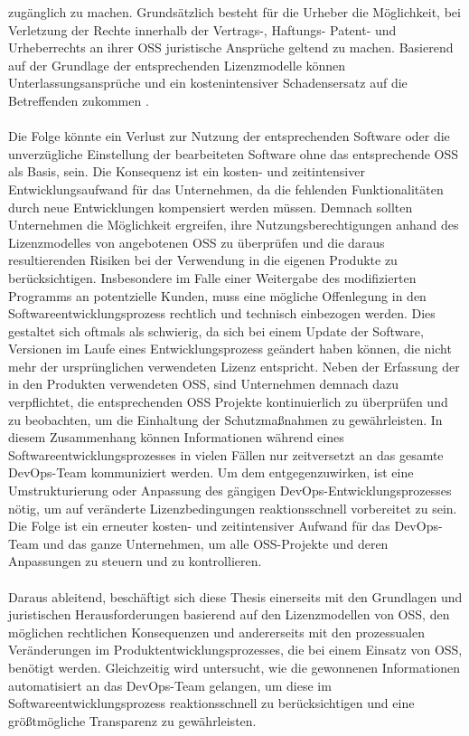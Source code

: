 zugänglich zu machen. Grundsätzlich besteht für die Urheber die Möglichkeit, bei Verletzung der Rechte innerhalb der Vertrags-, Haftungs- Patent- und Urheberrechts an ihrer OSS juristische Ansprüche geltend zu machen. Basierend auf der Grundlage der entsprechenden Lizenzmodelle können Unterlassungsansprüche und ein kostenintensiver Schadensersatz auf die Betreffenden zukommen \cite{helmreich_geschaftsrisiken_2012}.\\\\ Die Folge könnte ein Verlust zur Nutzung der entsprechenden Software oder die unverzügliche Einstellung der bearbeiteten Software ohne das entsprechende OSS als Basis, sein. Die Konsequenz ist ein kosten- und zeitintensiver Entwicklungsaufwand für das Unternehmen, da die fehlenden Funktionalitäten durch neue Entwicklungen kompensiert werden müssen. Demnach sollten Unternehmen die Möglichkeit ergreifen, ihre Nutzungsberechtigungen anhand des Lizenzmodelles von angebotenen OSS zu überprüfen und die daraus resultierenden Risiken bei der Verwendung in die eigenen Produkte zu berücksichtigen. Insbesondere im Falle einer Weitergabe des modifizierten Programms an potentzielle Kunden, muss eine mögliche Offenlegung in den Softwareentwicklungsprozess rechtlich und technisch einbezogen werden. Dies gestaltet sich oftmals als schwierig, da sich bei einem Update der Software, Versionen im Laufe eines Entwicklungsprozess geändert haben können, die nicht mehr der ursprünglichen verwendeten Lizenz entspricht. Neben der Erfassung der in den Produkten verwendeten OSS, sind Unternehmen demnach dazu verpflichtet, die entsprechenden OSS Projekte kontinuierlich zu überprüfen und zu beobachten, um die Einhaltung der Schutzmaßnahmen zu gewährleisten. In diesem Zusammenhang können Informationen während eines Softwareentwicklungsprozesses in vielen Fällen nur zeitversetzt an das gesamte DevOps-Team kommuniziert werden. Um dem entgegenzuwirken, ist eine Umstrukturierung oder Anpassung des gängigen DevOps-Entwicklungsprozesses nötig, um auf veränderte Lizenzbedingungen reaktionsschnell vorbereitet zu sein. Die Folge ist ein erneuter kosten- und zeitintensiver Aufwand für das DevOps-Team und das ganze Unternehmen, um alle OSS-Projekte und deren Anpassungen zu steuern und zu kontrollieren.\\\\Daraus ableitend, beschäftigt sich diese Thesis einerseits mit den Grundlagen und juristischen Herausforderungen basierend auf den Lizenzmodellen von OSS, den möglichen rechtlichen Konsequenzen und andererseits mit den prozessualen Veränderungen im Produktentwicklungsprozesses, die bei einem Einsatz von OSS, benötigt werden. Gleichzeitig wird untersucht, wie die gewonnenen Informationen automatisiert an das DevOps-Team gelangen, um diese im Softwareentwicklungsprozess reaktionsschnell zu berücksichtigen und eine größtmögliche Transparenz zu gewährleisten.  

